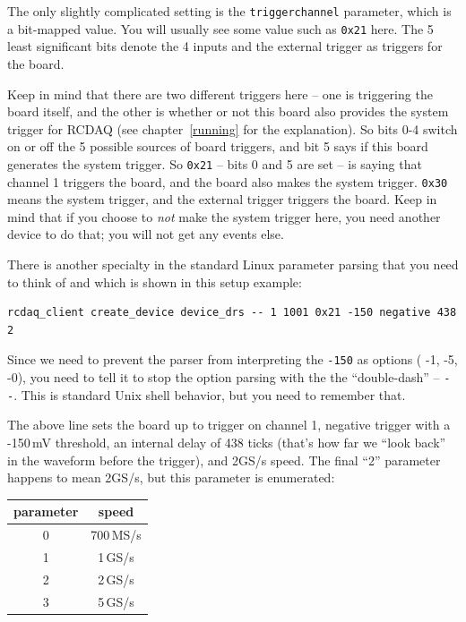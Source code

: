 \documentclass{article}[11pt]
\begin{document}
The only slightly complicated setting is the \verb|triggerchannel|
parameter, which is a bit-mapped value. You will usually see some
value such as \verb|0x21| here. The 5 least significant bits denote
the 4 inputs and the external trigger as triggers for the board.

Keep in mind that there are two different triggers here -- one is
triggering the board itself, and the other is whether or not this
board also provides the system trigger for RCDAQ (see
chapter~\ref{running} for the explanation). So bits 0-4 switch on or
off the 5 possible sources of board triggers, and bit 5 says if this
board generates the system trigger. So \verb|0x21| -- bits 0 and 5 are
set -- is saying that channel 1 triggers the board, and the board also
makes the system trigger. \verb|0x30| means the system trigger, and
the external trigger triggers the board. Keep in mind that if you
choose to \emph{not} make the system trigger here, you need another
device to do that; you will not get any events else.

There is another specialty in the standard Linux parameter
parsing that you need to think of and which is shown in this setup
example:

\begin{verbatim}
rcdaq_client create_device device_drs -- 1 1001 0x21 -150 negative 438 2
\end{verbatim}

Since we need to prevent the parser from interpreting the \verb|-150|
as options ( -1, -5, -0), you need to tell it to stop the option
parsing with the the ``double-dash'' -- \verb|--|. This is standard
Unix shell behavior, but you need to remember that.

The above line sets the board up to trigger on channel 1, negative trigger
with a -150\,mV threshold, an internal delay of 438 ticks (that's how
far we ``look back'' in the waveform before the trigger), and 2GS/s
speed. The final ``2'' parameter happens to mean 2GS/s, but this
parameter is enumerated:

\begin{center}
\begin{tabular}{|c|c|}
\hline
parameter & speed \\
\hline
\hline
    0 & 700\,MS/s  \\ \hline
    1 & 1\,GS/s   \\ \hline
    2 & 2\,GS/s   \\ \hline
    3 & 5\,GS/s   \\ \hline
\end{tabular}
\end{center}
\end{document}
